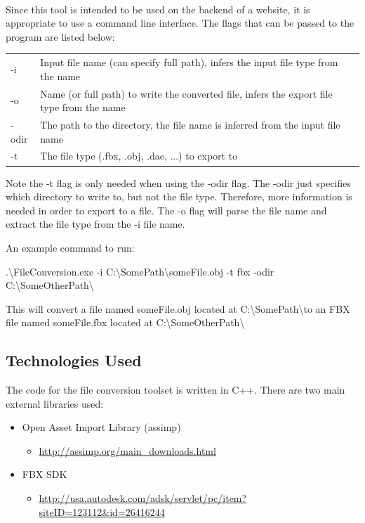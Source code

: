     \paragraph{}
    Since this tool is intended to be used on the backend of a website, it is appropriate to use a command line interface.  
    The flags that can be passed to the program are listed below:

    \begin{table}[h]
        \centering
        \begin{tabular}{l  l}
            -i & Input file name (can specify full path), infers the input file type from the name \\
            -o & Name (or full path) to write the converted file, infers the export file type from the name \\
            -odir & The path to the directory, the file name is inferred from the input file name \\
            -t & The file type (.fbx, .obj, .dae, ...) to export to
        \end{tabular}
    \end{table}

    Note the -t flag is only needed when using the -odir flag.  The -odir just specifies which directory to write to, but not the file type.
    Therefore, more information is needed in order to export to a file.  The -o flag will parse the file name and extract the file type from the -i file name.

    An example command to run:

    \begin{center}
        .\textbackslash FileConversion.exe -i C:\textbackslash SomePath\textbackslash someFile.obj -t fbx -odir C:\textbackslash SomeOtherPath\textbackslash
    \end{center}

    This will convert a file named someFile.obj located at C:\textbackslash SomePath\textbackslash  to an FBX file named someFile.fbx located at 
    C:\textbackslash SomeOtherPath\textbackslash

    \subsection{Technologies Used}

    The code for the file conversion toolset is written in C++.  There are two main external libraries used:
    \begin{itemize}
        \item Open Asset Import Library (assimp)
        \begin{itemize}
            \item \url{http://assimp.org/main_downloads.html}
        \end{itemize}

        \item FBX SDK
        \begin{itemize}
            \item \url{http://usa.autodesk.com/adsk/servlet/pc/item?siteID=123112&id=26416244}
        \end{itemize}
    \end{itemize}

